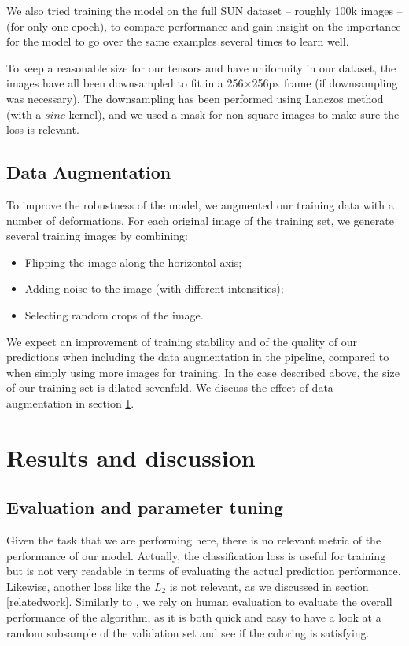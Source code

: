 \documentclass[10pt,twocolumn,letterpaper]{article}
\begin{document}
We also tried training the model on the full SUN dataset -- roughly 100k images --(for only one epoch), to compare performance and gain insight on the importance for the model to go over the same examples several times to learn well.


To keep a reasonable size for our tensors and have uniformity in our dataset, the images have all been downsampled to fit in a 256$\times$256px frame (if downsampling was necessary). The downsampling has been performed using Lanczos method (with a $sinc$ kernel), and we used a mask for non-square images to make sure the loss is relevant.

\subsection{Data Augmentation}

To improve the robustness of the model, we augmented our training data with a number of deformations. For each original image of the training set, we generate several training images by combining:
\begin{itemize}
\item Flipping the image along the horizontal axis;
\item Adding noise to the image (with different intensities);
\item Selecting random crops of the image.
\end{itemize}

We expect an improvement of training stability and of the quality of our predictions when including the data augmentation in the pipeline, compared to when simply using more images for training. In the case described above, the size of our training set is dilated sevenfold. We discuss the effect of data augmentation in section \ref{results}.

\section{Results and discussion}\label{results}

\subsection{Evaluation and parameter tuning}

Given the task that we are performing here, there is no relevant metric of the performance of our model. Actually, the classification loss is useful for training but is not very readable in terms of evaluating the actual prediction performance. Likewise, another loss like the $L_2$ is not relevant, as we discussed in section \ref{relatedwork}. Similarly to \cite{zhang2016colorful}, we rely on human evaluation to evaluate the overall performance of the algorithm, as it is both quick and easy to have a look at a random subsample of the validation set and see if the coloring is satisfying.
\end{document}
